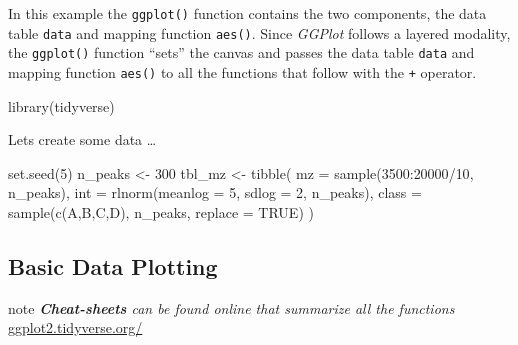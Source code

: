 \documentclass[
]{book}
\newenvironment{Shaded}{\begin{snugshade}}{\end{snugshade}}
\newcommand{\AttributeTok}[1]{\textcolor[rgb]{0.77,0.63,0.00}{#1}}
\newcommand{\ConstantTok}[1]{\textcolor[rgb]{0.00,0.00,0.00}{#1}}
\newcommand{\DecValTok}[1]{\textcolor[rgb]{0.00,0.00,0.81}{#1}}
\newcommand{\FunctionTok}[1]{\textcolor[rgb]{0.00,0.00,0.00}{#1}}
\newcommand{\NormalTok}[1]{#1}
\newcommand{\OtherTok}[1]{\textcolor[rgb]{0.56,0.35,0.01}{#1}}
\newcommand{\SpecialCharTok}[1]{\textcolor[rgb]{0.00,0.00,0.00}{#1}}
\newcommand{\StringTok}[1]{\textcolor[rgb]{0.31,0.60,0.02}{#1}}
\begin{document}
In this example the \texttt{ggplot()} function contains the two components, the data table \texttt{data} and mapping function \texttt{aes()}. Since \emph{GGPlot} follows a layered modality, the \texttt{ggplot()} function ``sets'' the canvas and passes the data table \texttt{data} and mapping function \texttt{aes()} to all the functions that follow with the \texttt{+} operator.

\begin{Shaded}
\begin{Highlighting}[]
\FunctionTok{library}\NormalTok{(tidyverse)}
\end{Highlighting}
\end{Shaded}

Lets create some data \ldots{}

\begin{Shaded}
\begin{Highlighting}[]
\FunctionTok{set.seed}\NormalTok{(}\DecValTok{5}\NormalTok{)}
\NormalTok{n\_peaks }\OtherTok{\textless{}{-}} \DecValTok{300}
\NormalTok{tbl\_mz }\OtherTok{\textless{}{-}} \FunctionTok{tibble}\NormalTok{(}
  \AttributeTok{mz =} \FunctionTok{sample}\NormalTok{(}\DecValTok{3500}\SpecialCharTok{:}\DecValTok{20000}\SpecialCharTok{/}\DecValTok{10}\NormalTok{, n\_peaks),}
  \AttributeTok{int =} \FunctionTok{rlnorm}\NormalTok{(}\AttributeTok{meanlog =} \DecValTok{5}\NormalTok{, }\AttributeTok{sdlog =} \DecValTok{2}\NormalTok{, n\_peaks),}
  \AttributeTok{class =} \FunctionTok{sample}\NormalTok{(}\FunctionTok{c}\NormalTok{(}\StringTok{\textquotesingle{}A\textquotesingle{}}\NormalTok{,}\StringTok{\textquotesingle{}B\textquotesingle{}}\NormalTok{,}\StringTok{\textquotesingle{}C\textquotesingle{}}\NormalTok{,}\StringTok{\textquotesingle{}D\textquotesingle{}}\NormalTok{), n\_peaks, }\AttributeTok{replace =} \ConstantTok{TRUE}\NormalTok{) }
\NormalTok{)}
\end{Highlighting}
\end{Shaded}

\hypertarget{basic-data-plotting}{%
\subsection{Basic Data Plotting}\label{basic-data-plotting}}

\begin{infobox}{note}
\emph{\textbf{Cheat-sheets} can be found online that summarize all the functions}\\
\href{https://ggplot2.tidyverse.org/}{ggplot2.tidyverse.org/}

\end{infobox}
\end{document}
